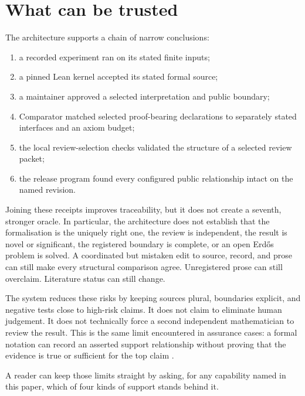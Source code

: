 \documentclass[10pt]{article}
\begin{document}
\section{What can be trusted}\label{sec:trust}

The architecture supports a chain of narrow conclusions:

\begin{enumerate}
\item a recorded experiment ran on its stated finite inputs;
\item a pinned Lean kernel accepted its stated formal source;
\item a maintainer approved a selected interpretation and public boundary;
\item Comparator matched selected proof-bearing declarations to separately
      stated interfaces and an axiom budget;
\item the local review-selection checks validated the structure of a selected
      review packet;
\item the release program found every configured public relationship intact on
      the named revision.
\end{enumerate}

Joining these receipts improves traceability, but it does not create a seventh,
stronger oracle. In particular, the architecture does not establish that the
formalisation is the uniquely right one, the review is independent, the result
is novel or significant, the registered boundary is complete, or an open
Erd\H{o}s problem is solved. A coordinated but mistaken edit to source, record,
and prose can still make every structural comparison agree. Unregistered prose
can still overclaim. Literature status can still change.

The system reduces these risks by keeping sources plural, boundaries explicit,
and negative tests close to high-risk claims. It does not claim to eliminate
human judgement. It does not technically force a second independent
mathematician to review the result. This is the same limit encountered in
assurance cases: a formal notation can record an asserted support relationship
without proving that the evidence is true or sufficient for the top claim
\cite{gsn}.

A reader can keep those limits straight by asking, for any capability named
in this paper, which of four kinds of support stands behind it.
\end{document}
